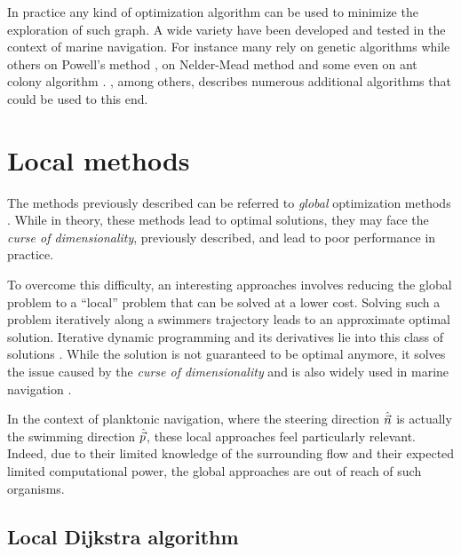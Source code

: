 In practice any kind of optimization algorithm can be used to minimize the exploration of such graph.
A wide variety have been developed and tested in the context of marine navigation.
For instance many rely on genetic algorithms \citep{avgouleas2014fuel, vettor2016development} while others on Powell's method \citep{kobayashi2017advanced}, on Nelder-Mead method \citep{pipchenko201120} and some even on ant colony algorithm \citep{tsou2013ant}.
\citet{brownlee2011clever}, among others, describes numerous additional algorithms that could be used to this end.

\section{Local methods}

The methods previously described can be referred to \textit{global} optimization methods \citep{todorov2009iterative}.
While in theory, these methods lead to optimal solutions, they may face the \textit{curse of dimensionality},  previously described, and lead to poor performance in practice.

To overcome this difficulty, an interesting approaches involves reducing the global problem to a ``local'' problem that can be solved at a lower cost.
Solving such a problem iteratively along a swimmers trajectory leads to an approximate optimal solution.
Iterative dynamic programming and its derivatives lie into this class of solutions \citep{todorov2009iterative, luus2019iterative}.
While the solution is not guaranteed to be optimal anymore, it solves the issue caused by the \textit{curse of dimensionality} and is also widely used in marine navigation \citep{avgouleas2008optimal, avgouleas2014fuel}.

In the context  of planktonic navigation, where the steering direction $\hat{\vec{n}}$ is actually the swimming direction $\hat{\vec{p}}$, these local approaches feel particularly relevant.
Indeed, due to their limited knowledge of the surrounding flow and their expected limited computational power, the global approaches are out of reach of such organisms.

\subsection{Local Dijkstra algorithm}

